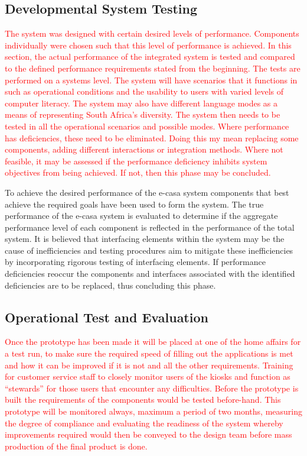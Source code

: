 \documentclass[a4paper,11pt,fleqn]{report}
\begin{document}
\subsection{Developmental System Testing}
\textcolor{red}{The system was designed with certain desired levels of performance. Components individually were chosen such that this level of performance is achieved. In this section, the actual performance of the integrated system is tested and compared to the defined performance requirements stated from the beginning. The tests are performed on a systems level. The system will have scenarios that it functions in such as operational conditions and the usability to users with varied levels of computer literacy. The system may also have different language modes as a means of representing South Africa’s diversity. The system then needs to be tested in all the operational scenarios and possible modes. Where performance has deficiencies, these need to be eliminated. Doing this my mean replacing some components, adding different interactions or integration methods. Where not feasible, it may be assessed if the performance deficiency inhibits system objectives from being achieved. If not, then this phase may be concluded.}

To achieve the desired performance of the e-casa system components that best achieve the required goals have been used to form the system. The true performance of the e-casa system is evaluated to determine if the aggregate performance level of each component is reflected in the performance of the total system. It is believed that interfacing elements within the system may be the cause of inefficiencies and testing procedures aim to mitigate these inefficiencies by incorporating rigorous testing of interfacing elements. If performance deficiencies reoccur the components and interfaces associated with the identified deficiencies are to be replaced, thus concluding this phase.

\subsection{Operational Test and Evaluation}
\textcolor{red}{Once the prototype has been made it will be placed at one of the home affairs for a test run, to make sure the required speed of filling out the applications is met and how it can be improved if it is not and all the other requirements. Training for customer service staff to closely monitor users of the kiosks and function as “stewards” for those users that encounter any difficulties. Before the prototype is built the requirements of the components would be tested before-hand. This prototype will be monitored always, maximum a period of two months, measuring the degree of compliance and evaluating the readiness of the system whereby improvements required would then be conveyed to the design team before mass production of the final product is done.}
\end{document}
